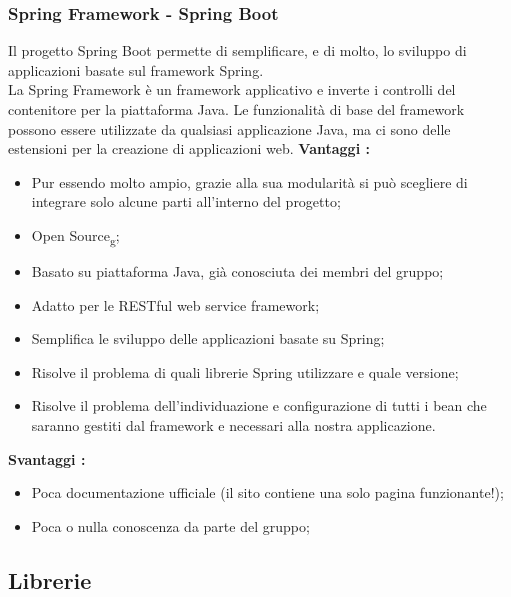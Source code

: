{{		\subsubsection{Spring Framework - Spring Boot}{
			Il progetto Spring Boot permette di semplificare, e di molto, lo sviluppo di applicazioni basate sul framework Spring.\\
			La Spring Framework è un framework applicativo e inverte i controlli del contenitore per la piattaforma Java. Le funzionalità di base del framework possono essere utilizzate da qualsiasi applicazione Java, ma ci sono delle estensioni per la creazione di applicazioni web. 
			\textbf{Vantaggi :}
			\begin{itemize}\itemsep1pt
				\item Pur essendo molto ampio, grazie alla sua modularità si può scegliere di integrare solo alcune parti all'interno del progetto;
				\item Open Source\textsubscript{g};
				\item Basato su piattaforma Java, già conosciuta dei membri del gruppo;
				\item Adatto per le RESTful web service framework;
				\item Semplifica le sviluppo delle applicazioni basate su Spring;
				\item Risolve il problema di quali librerie Spring utilizzare e quale versione;
				\item Risolve il problema dell'individuazione e configurazione di tutti i bean che saranno gestiti dal framework e necessari alla nostra applicazione. 
			\end{itemize}
			\textbf{Svantaggi :}
			\begin{itemize}\itemsep1pt
				\item Poca documentazione ufficiale (il sito contiene una solo pagina funzionante!);
				\item Poca o nulla conoscenza da parte del gruppo;
			\end{itemize}
	}
	
	}
	\subsection{Librerie}{
}}
